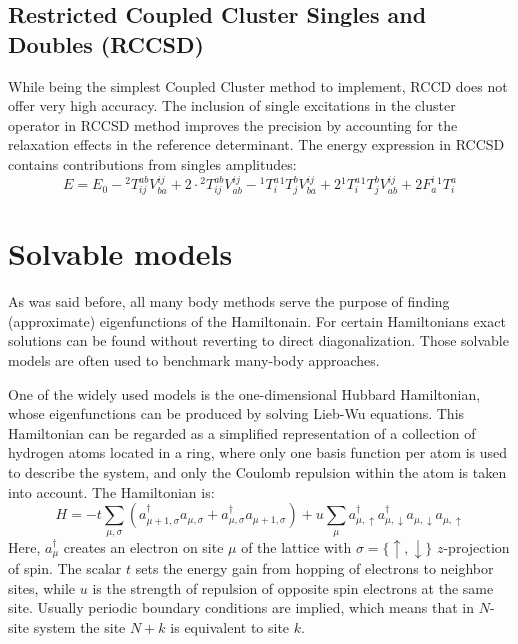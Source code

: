 \subsection{Restricted Coupled Cluster Singles and Doubles (RCCSD)
\label{sec:preliminaries_rccsd}}
While being the simplest Coupled Cluster method to implement, RCCD does not 
offer very high accuracy. The inclusion of single excitations in the cluster 
operator in RCCSD method improves the precision by accounting for the 
relaxation effects in the reference determinant. The energy expression in 
RCCSD contains contributions from singles amplitudes:
%
\begin{equation}
  E = E_{0} - {}^{2}T^{ab}_{ij}  V^{ij}_{ba} + 2 \cdot   
{}^{2}T^{ab}_{ij}  V^{ij}_{ab}  - {}^{1}T^{a}_{i}  
{}^{1}T^{b}_{j}  V^{ij}_{ba}   + 2 {}^{1}T^{a}_{i}  
{}^{1}T^{b}_{j}  V^{ij}_{ab}   + 2 F^{i}_{a}  {}^{1}T^{a}_{i}
\end{equation}
%

\section{Solvable models
\label{sec:hubbard_hamiltonian}}
As was said before, all many body methods serve the purpose of finding 
(approximate) eigenfunctions of the Hamiltonain. For certain 
Hamiltonians exact solutions can be found without reverting to direct 
diagonalization.\cite{dukelsky2004colloquium} Those solvable models are often 
used to benchmark many-body approaches.

One of the widely used models is the one-dimensional Hubbard 
Hamiltonian, whose eigenfunctions can be produced by solving Lieb-Wu 
equations.\cite{lieb1968absence} This Hamiltonian can be regarded as a 
simplified representation of a collection of hydrogen atoms located in a 
ring, where only one basis function per atom is used to describe the system, 
and only the Coulomb repulsion within the atom is taken into account. 
The Hamiltonian is:
\begin{equation}
 H = - t \sum_{\mu, \sigma} (a^\dagger_{\mu + 1, \sigma} a_{\mu, 
\sigma} + a^\dagger_{\mu, \sigma} a_{\mu + 1, 
\sigma}) + u \sum_{\mu} a^\dagger_{\mu, \uparrow} a^\dagger_{\mu, \downarrow} 
a_{\mu, \downarrow} a_{\mu, \uparrow}
\end{equation}
Here, $a^\dagger_{\mu}$ creates an electron on site $\mu$ of the lattice with 
$\sigma = \{ \uparrow, \downarrow \}$ $z$-projection of
spin. The scalar $t$ sets the energy gain from hopping of electrons to neighbor 
sites, while $u$ is the strength of repulsion of opposite spin electrons 
at the same site. Usually periodic boundary conditions are implied, which means 
that in $N$-site system the site $N + k$ is equivalent to site $k$.

